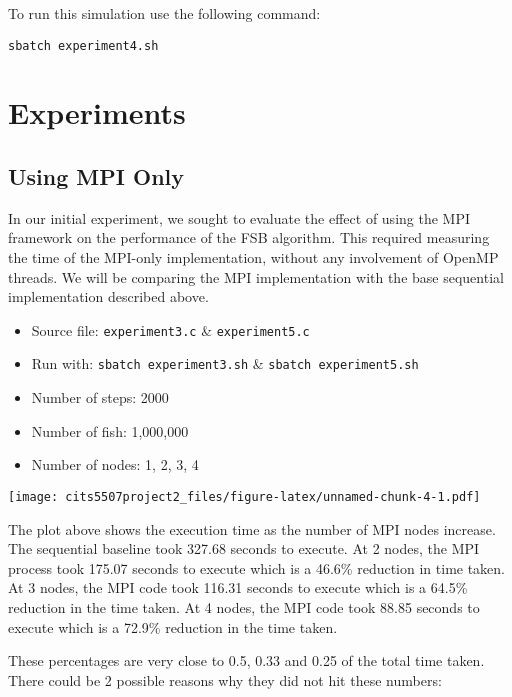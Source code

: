 \documentclass[
]{article}
\providecommand{\tightlist}{%
  \setlength{\itemsep}{0pt}\setlength{\parskip}{0pt}}
\begin{document}
To run this simulation use the following command:

\begin{verbatim}
sbatch experiment4.sh
\end{verbatim}

\hypertarget{experiments}{%
\section{Experiments}\label{experiments}}

\hypertarget{using-mpi-only}{%
\subsection{Using MPI Only}\label{using-mpi-only}}

In our initial experiment, we sought to evaluate the effect of using the
MPI framework on the performance of the FSB algorithm. This required
measuring the time of the MPI-only implementation, without any
involvement of OpenMP threads. We will be comparing the MPI
implementation with the base sequential implementation described above.

\begin{itemize}
\tightlist
\item
  Source file: \texttt{experiment3.c} \& \texttt{experiment5.c}
\item
  Run with: \texttt{sbatch\ experiment3.sh} \&
  \texttt{sbatch\ experiment5.sh}
\item
  Number of steps: 2000
\item
  Number of fish: 1,000,000
\item
  Number of nodes: 1, 2, 3, 4
\end{itemize}

\texttt{[image: cits5507project2\_files/figure-latex/unnamed-chunk-4-1.pdf]}

The plot above shows the execution time as the number of MPI nodes
increase. The sequential baseline took 327.68 seconds to execute. At 2
nodes, the MPI process took 175.07 seconds to execute which is a 46.6\%
reduction in time taken. At 3 nodes, the MPI code took 116.31 seconds to
execute which is a 64.5\% reduction in the time taken. At 4 nodes, the
MPI code took 88.85 seconds to execute which is a 72.9\% reduction in
the time taken.

These percentages are very close to 0.5, 0.33 and 0.25 of the total time
taken. There could be 2 possible reasons why they did not hit these
numbers:
\end{document}
